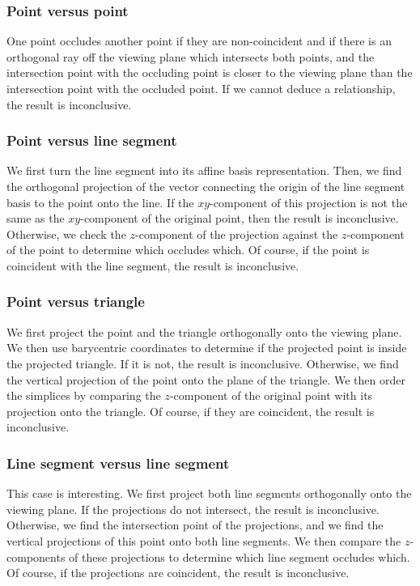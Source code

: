 \subsubsection{Point versus point}

One point occludes another point if they are non-coincident and if 
there is an orthogonal ray off the viewing plane which intersects
both points, and the intersection point with the occluding point is
closer to the viewing plane than the intersection point with the
occluded point. If we cannot deduce a relationship, the result is 
inconclusive.

\subsubsection{Point versus line segment}

We first turn the line segment into its affine basis representation.
Then, we find the orthogonal projection of the vector connecting the 
origin of the line segment basis to the point onto the line. If the 
\(xy\)-component of this projection is not the same as the 
\(xy\)-component of the original point, then the result is inconclusive.
Otherwise, we check the \(z\)-component of the projection against the
\(z\)-component of the point to determine which occludes which.
Of course, if the point is coincident with the line segment, the result 
is inconclusive.

\subsubsection{Point versus triangle}

We first project the point and the triangle orthogonally onto the 
viewing plane. We then use barycentric coordinates to determine if the
projected point is inside the projected triangle. If it is not, the
result is inconclusive. Otherwise, we find the vertical projection
of the point onto the plane of the triangle. We then order the 
simplices by comparing the \(z\)-component of the original point 
with its projection onto the triangle. Of course, if they are 
coincident, the result is inconclusive.

\subsubsection{Line segment versus line segment}

This case is interesting. We first project both line segments
orthogonally onto the viewing plane. If the projections do not
intersect, the result is inconclusive. Otherwise, we find the
intersection point of the projections, and we find the vertical
projections of this point onto both line segments. We then compare
the \(z\)-components of these projections to determine which line
segment occludes which. Of course, if the projections are coincident,
the result is inconclusive.

